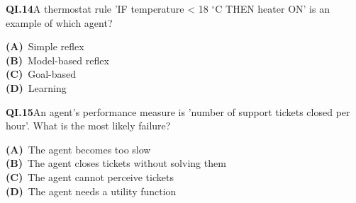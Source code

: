\documentclass[11pt]{article}
\begin{document}
\begin{tcolorbox}[enhanced,breakable,colback=white,colframe=navyL,arc=2mm,boxrule=0.7pt,left=3mm,right=3mm,top=2mm,bottom=2mm]
\textbf{\color{navy}QI.14}\quad A thermostat rule 'IF temperature < 18 $^\circ$C THEN heater ON' is an example of which agent?\hfill{}\par\smallskip
{\small \textbf{\color{navyL}(A)}\ Simple reflex\\[1pt]\textbf{\color{navyL}(B)}\ Model-based reflex\\[1pt]\textbf{\color{navyL}(C)}\ Goal-based\\[1pt]\textbf{\color{navyL}(D)}\ Learning}
\end{tcolorbox}
\begin{tcolorbox}[enhanced,breakable,colback=white,colframe=navyL,arc=2mm,boxrule=0.7pt,left=3mm,right=3mm,top=2mm,bottom=2mm]
\textbf{\color{navy}QI.15}\quad An agent's performance measure is 'number of support tickets closed per hour'. What is the most likely failure?\hfill{}\par\smallskip
{\small \textbf{\color{navyL}(A)}\ The agent becomes too slow\\[1pt]\textbf{\color{navyL}(B)}\ The agent closes tickets without solving them\\[1pt]\textbf{\color{navyL}(C)}\ The agent cannot perceive tickets\\[1pt]\textbf{\color{navyL}(D)}\ The agent needs a utility function}
\end{tcolorbox}
\newpage
\end{document}
